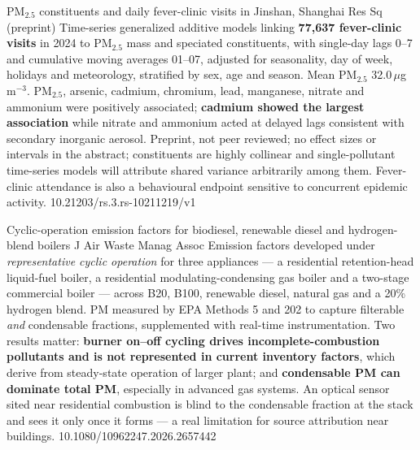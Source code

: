\documentclass[10pt]{article}
\begin{document}

{PM$_{2.5}$ constituents and daily fever-clinic visits in Jinshan, Shanghai}
{Res Sq (preprint)}
{Time-series generalized additive models linking \textbf{77{,}637 fever-clinic visits} in
2024 to PM$_{2.5}$ mass and speciated constituents, with single-day lags 0--7 and
cumulative moving averages 01--07, adjusted for seasonality, day of week, holidays and
meteorology, stratified by sex, age and season. Mean PM$_{2.5}$ 32.0\,$\mu$g\,m$^{-3}$.
PM$_{2.5}$, arsenic, cadmium, chromium, lead, manganese, nitrate and ammonium were
positively associated; \textbf{cadmium showed the largest association} while nitrate and
ammonium acted at delayed lags consistent with secondary inorganic aerosol. Preprint, not
peer reviewed; no effect sizes or intervals in the abstract; constituents are highly
collinear and single-pollutant time-series models will attribute shared variance
arbitrarily among them. Fever-clinic attendance is also a behavioural endpoint sensitive
to concurrent epidemic activity.}
{10.21203/rs.3.rs-10211219/v1}


{Cyclic-operation emission factors for biodiesel, renewable diesel and hydrogen-blend boilers}
{J Air Waste Manag Assoc}
{Emission factors developed under \emph{representative cyclic operation} for three
appliances --- a residential retention-head liquid-fuel boiler, a residential
modulating-condensing gas boiler and a two-stage commercial boiler --- across B20, B100,
renewable diesel, natural gas and a 20\% hydrogen blend. PM measured by EPA Methods 5 and
202 to capture filterable \emph{and} condensable fractions, supplemented with real-time
instrumentation. Two results matter: \textbf{burner on--off cycling drives
incomplete-combustion pollutants and is not represented in current inventory factors},
which derive from steady-state operation of larger plant; and \textbf{condensable PM can
dominate total PM}, especially in advanced gas systems. An optical sensor sited near
residential combustion is blind to the condensable fraction at the stack and sees it only
once it forms --- a real limitation for source attribution near buildings.}
{10.1080/10962247.2026.2657442}
\end{document}
